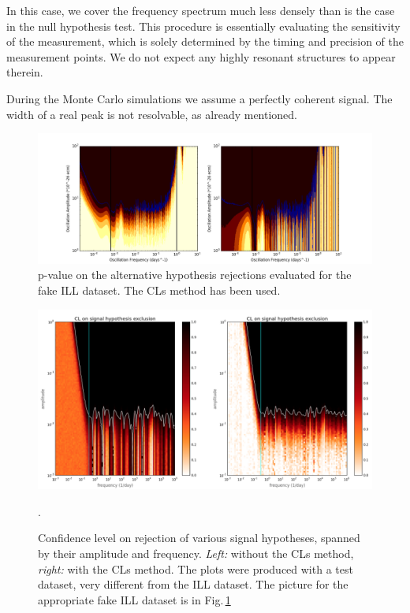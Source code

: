 In this case, we cover the frequency spectrum much less densely than is the case in the null hypothesis test. This procedure is essentially evaluating the sensitivity of the measurement, which is solely determined by the timing and precision of the measurement points. We do not expect any highly resonant structures to appear therein.

During the Monte Carlo simulations we assume a perfectly coherent signal. The width of a real peak is not resolvable, as already mentioned.

\begin{figure}[htb]
  \begin{center}
    \includegraphics[width=\columnwidth]{gfx/axions/ILL_p_signal_and_cls_sensible.png}
    \caption{p-value on the alternative hypothesis rejections evaluated for the fake ILL dataset. The CLs method has been used. }
  \label{fig:ILL_exclusion}
  \end{center}
\end{figure}

\begin{figure}[htb]
  \centering \includegraphics[width=\linewidth]{gfx/axions/exclusion_no_CLs.png}
  \caption{Confidence level  on rejection of various signal hypotheses, spanned by their amplitude and frequency. \emph{Left:} without the CLs method, \emph{right:} with the CLs method. The plots were produced with a test dataset, very different from the ILL dataset. The picture for the appropriate fake ILL dataset is in Fig.\,\ref{fig:ILL_exclusion}}.
  \label{fig:exclusion_no_CLs}
\end{figure}

